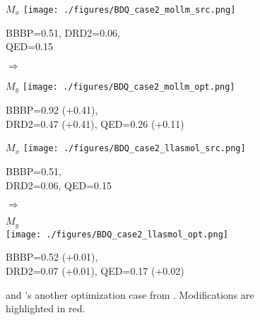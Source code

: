 \begin{figure}[p]
    \centering
    \begin{minipage}{0.43\linewidth}
        \centering
        \tiny $M_x$
        \texttt{[image: ./figures/BDQ\_case2\_mollm\_src.png]}
        \par\vspace{2pt}
        \tiny BBBP=0.51, DRD2=0.06, \\
        \tiny QED=0.15
    \end{minipage}
    \hfill
    \begin{minipage}{0.1\linewidth}
        \centering \Large$\Rightarrow$\\
        \raggedright \tiny \mollm
        \raggedright \tiny {}
    \end{minipage}
    \hfill
    \begin{minipage}{0.44\linewidth}
        \centering
        \tiny $M_y$
        \texttt{[image: ./figures/BDQ\_case2\_mollm\_opt.png]}
        \par\vspace{2pt}
        \tiny BBBP=0.92 (+0.41),\\ 
        \tiny DRD2=0.47 (+0.41), QED=0.26 (+0.11)
    \end{minipage}

    \vspace{1em}

    \begin{minipage}{0.43\linewidth}
        \centering
        \tiny $M_x$
        \texttt{[image: ./figures/BDQ\_case2\_llasmol\_src.png]}
        \par\vspace{2pt}
        \tiny BBBP=0.51, \\
        \tiny DRD2=0.06, QED=0.15
    \end{minipage}
    \hfill
    \begin{minipage}{0.1\linewidth}
        \centering \Large$\Rightarrow$\\
        \raggedright \tiny \LlaSMol
        \raggedright \tiny {}
    \end{minipage}
    \hfill
    \begin{minipage}{0.44\linewidth}
        \centering
        \tiny $M_y$\\
        \texttt{[image: ./figures/BDQ\_case2\_llasmol\_opt.png]}
        \par\vspace{1pt}
        \tiny BBBP=0.52 (+0.01), \\ 
        \tiny DRD2=0.07 (+0.01), QED=0.17 (+0.02)
    \end{minipage}
    \caption{{\mollmSixGenM} and {\LlaSMolM}'s another optimization case from \BDQ. Modifications are highlighted in red.}
    \label{fig:BDQ_case2_appendix}
\end{figure}
